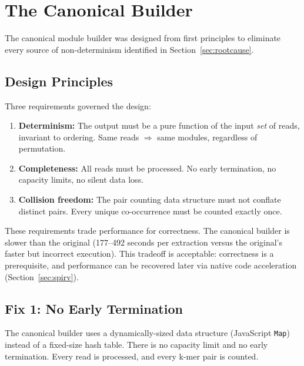 \documentclass{../yalumba}
\begin{document}
\section{The Canonical Builder}
\label{sec:canonical}

The canonical module builder was designed from first principles to eliminate
every source of non-determinism identified in Section~\ref{sec:rootcause}.

\subsection{Design Principles}

Three requirements governed the design:

\begin{enumerate}[leftmargin=2em]
  \item \textbf{Determinism:} The output must be a pure function of the input
    \textit{set} of reads, invariant to ordering. Same reads $\Rightarrow$ same
    modules, regardless of permutation.
  \item \textbf{Completeness:} All reads must be processed. No early termination,
    no capacity limits, no silent data loss.
  \item \textbf{Collision freedom:} The pair counting data structure must not
    conflate distinct pairs. Every unique co-occurrence must be counted exactly
    once.
\end{enumerate}

These requirements trade performance for correctness. The canonical builder is
slower than the original (177--492 seconds per extraction versus the original's
faster but incorrect execution). This tradeoff is acceptable: correctness is a
prerequisite, and performance can be recovered later via native code
acceleration (Section~\ref{sec:spirv}).

\subsection{Fix 1: No Early Termination}

The canonical builder uses a dynamically-sized data structure (JavaScript
\texttt{Map}) instead of a fixed-size hash table. There is no capacity limit
and no early termination. Every read is processed, and every k-mer pair is
counted.
\end{document}
